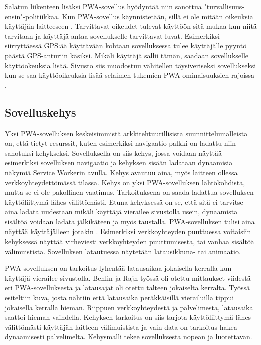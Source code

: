 \documentclass{tktltiki}
\begin{document}
Salatun liikenteen lisäksi PWA-sovellus hyödyntää niin sanottua "turvallisuus-ensin"-politiikkaa. Kun PWA-sovellus käynnistetään, sillä ei ole mitään oikeuksia käyttäjän laitteeseen \cite{8287006}. Tarvittavat oikeudet tulevat käyttöön sitä mukaa kun niitä tarvitaan ja käyttäjä antaa sovellukselle tarvittavat luvat. Esimerkiksi siirryttäessä GPS:ää käyttävään kohtaan sovelluksessa tulee käyttäjälle pyyntö päästä GPS-anturiin käsiksi. Mikäli käyttäjä sallii tämän, saadaan sovellukselle käyttöokeuksia lisää. Sivusto siis muodostuu vähitellen täysiveriseksi sovellukseksi kun se saa käyttöoikeuksia lisää selaimen tukemien PWA-ominaisuuksien rajoissa \cite{von2018progressive}.

\subsection{Sovelluskehys}

Yksi PWA-sovelluksen keskeisimmistä arkkitehtuurillisista suunnittelumalleista on, että tietyt resurssit, kuten esimerkiksi navigaatio-palkki on ladattu niin sanotuksi kehykseksi. \cite{8441701} Sovelluksella on siis kehys, jossa voidaan näyttää esimerkiksi sovelluksen navigaatio ja kehyksen sisään ladataan dynaamisia näkymiä Service Workerin avulla. Kehys avautuu aina, myös laitteen ollessa verkkoyhteydettömässä tilassa. Kehys on yksi PWA-sovelluksen lähtökohdista, mutta se ei ole pakollinen vaatimus. Tarkoituksena on saada ladattua sovelluksen käyttöliittymä lähes välittömästi. Etuna kehyksessä on se, että sitä ei tarvitse aina ladata uudestaan mikäli käyttäjä vierailee sivustolla usein, dynaamista sisältöä voidaan ladata jälkikäteen ja myös taustalla. PWA-sovelluksen tulisi aina näyttää käyttäjälleen jotakin \cite{von2018progressive}. Esimerkiksi verkkoyhteyden puuttuessa voitaisiin kehyksessä näyttää virheviesti verkkoyhteyden puuttumisesta, tai vanhaa sisältöä välimuistista. Sovelluksen latautuessa näytetään latausikkuna- tai animaatio.

PWA-sovelluksen on tarkoitus lyhentää latausaikaa jokaisella kerralla kun käyttäjä vierailee sivustolla. Behlin ja Rajn työssä \cite{8441701} oli otettu mittaukset viidestä eri PWA-sovelluksesta ja latausajat oli otettu talteen jokaiselta kerralta. Työssä esiteltiin kuva, josta nähtiin että latausaika peräkkäisillä vierailuilla tippui jokaisella kerralla hieman. Riippuen verkkoyhteydestä ja palvelimesta, latausaika saattoi hieman vaihdella. Kehyksen tarkoitus on siis tarjota käyttöliittymä lähes välittömästi käyttäjän laitteen välimuistista ja vain data on tarkoitus hakea dynaamisesti palvelimelta. Kehysmalli tekee sovelluksesta nopean ja luotettavan.
\end{document}
